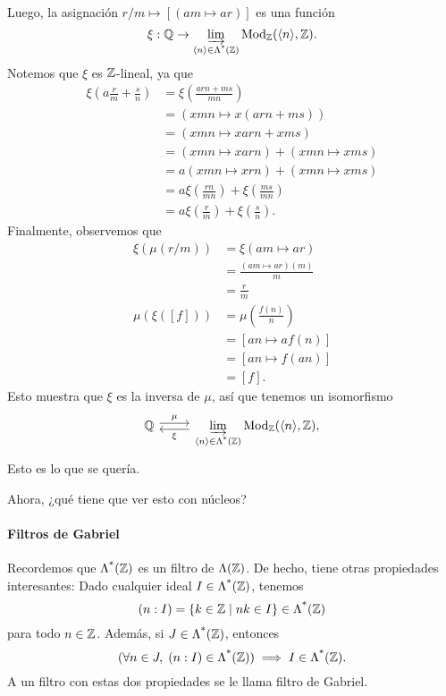 \begin{sol}
    Luego, la asignación $r/m\mapsto [(am\mapsto ar)]$
    es una función
    \[
        \xi:\mathbb Q\to\varinjlim_{\langle n\rangle\in\Lambda^{\text{*}}({\mathbb Z})}\mathrm{Mod}_\mathbb Z(\langle n\rangle,\mathbb Z)
    .\]
    Notemos que $\xi$ es $\mathbb Z$-lineal, ya que
    \begin{align*}
        \xi\left(a\frac r m + \frac s n\right)
        &= \xi\left(\frac{arn + ms}{mn}\right) \\
        &= \left( xmn \mapsto x(arn+ms) \right) \\
        &= (xmn \mapsto xarn+xms) \\
        &= (xmn \mapsto xarn) + (xmn \mapsto xms) \\
        &= a(xmn \mapsto xrn) + (xmn \mapsto xms) \\
        &= a\xi\left(\frac{rn}{mn}\right)
            + \xi\left(\frac{ms}{mn}\right) \\
        &= a\xi\left(\frac{r}{m}\right)
            + \xi\left(\frac{s}{n}\right).
    \end{align*}
    Finalmente, observemos que
    \begin{align*}
        \xi(\mu(r/m))
        &= \xi(am\mapsto ar) \\
        &= \frac{(am\mapsto ar)(m)}{m} \\
        &= \frac{r}{m} \\
        \mu(\xi([f]))
        &= \mu\left(\frac{f(n)} n \right) \\
        &= [an\mapsto af(n)] \\
        &= [an\mapsto f(an)] \\
        &= [f]
    .\end{align*}
    Esto muestra que $\xi$ es la inversa de $\mu$,
    así que tenemos un isomorfismo
    \[
        \begin{tikzcd}
        \mathbb Q \ar[r,shift left,"\mu"] &
        \displaystyle
        \varinjlim_{\<n\>\in\nti\Z}\Mod_\Z(\<n\>,\Z),
        \ar[l,shift left,"\xi"]
       \end{tikzcd} 
    \]
    Esto es lo que se quería.
\end{sol}

Ahora, ¿qué tiene que ver esto con núcleos?

\paragraph{Filtros de Gabriel}
Recordemos que $\Lambda^{\text{*}}({\mathbb Z})$ es un filtro de $\Lambda(\mathbb Z)$.
De hecho, tiene otras propiedades interesantes:
Dado cualquier ideal $I\in\Lambda^{\text{*}}({\mathbb Z})$, tenemos
\[
    (n:I)=\{k\in\mathbb Z\mid nk\in I\}\in\Lambda^{\text{*}}({\mathbb Z})
\]
para todo $n\in\mathbb Z$.
Además, si $J\in\Lambda^{\text{*}}({\mathbb Z})$, entonces
\[
    (\forall n\in J,\; (n:I)\in\Lambda^{\text{*}}({\mathbb Z}))\implies I\in\Lambda^{\text{*}}({\mathbb Z})
.\]
A un filtro con estas dos propiedades se le llama filtro de Gabriel.

